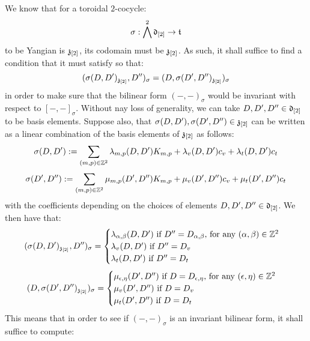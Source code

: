         \begin{remark} \label{remark: yangian_criterion_for_toroidal_cocycles}
            We know that for a toroidal $2$-cocycle:
                $$\sigma: \bigwedge^2 \mathfrak{d}_{[2]} \to \mathfrak{t}$$
            to be Yangian is $\mathfrak{z}_{[2]}$, its codomain must be $\mathfrak{z}_{[2]}$. As such, it shall suffice to find a condition that it must satisfy so that:
                $$(\sigma(D, D')_{\mathfrak{z}_{[2]}}, D'')_{\sigma} = (D, \sigma(D', D'')_{\mathfrak{z}_{[2]}})_{\sigma}$$
            in order to make sure that the bilinear form $(-, -)_{\sigma}$ would be invariant with respect to $[-, -]_{\sigma}$. Without nay loss of generality, we can take $D, D', D'' \in \mathfrak{d}_{[2]}$ to be basis elements. Suppose also, that $\sigma(D, D'), \sigma(D', D'') \in \mathfrak{z}_{[2]}$ can be written as a linear combination of the basis elements of $\mathfrak{z}_{[2]}$ as follows:
                $$\sigma(D, D') := \sum_{(m, p) \in \mathbb{Z}^2} \lambda_{m, p}(D, D') K_{m, p} + \lambda_v(D, D') c_v + \lambda_t(D, D') c_t$$
                $$\sigma(D', D'') := \sum_{(m, p) \in \mathbb{Z}^2} \mu_{m, p}(D', D'') K_{m, p} + \mu_v(D', D'') c_v + \mu_t(D', D'') c_t$$
            with the coefficients depending on the choices of elements $D, D', D'' \in \mathfrak{d}_{[2]}$. We then have that:
                $$
                    (\sigma(D, D')_{\mathfrak{z}_{[2]}}, D'')_{\sigma} =
                    \begin{cases}
                        \text{$\lambda_{\alpha, \beta}(D, D')$ if $D'' = D_{\alpha, \beta}$, for any $(\alpha, \beta) \in \mathbb{Z}^2$}
                        \\
                        \text{$\lambda_v(D, D')$ if $D'' = D_v$}
                        \\
                        \text{$\lambda_t(D, D')$ if $D'' = D_t$}
                    \end{cases}
                $$
                $$
                    (D, \sigma(D', D'')_{\mathfrak{z}_{[2]}})_{\sigma} =
                    \begin{cases}
                        \text{$\mu_{\epsilon, \eta}(D', D'')$ if $D = D_{\epsilon, \eta}$, for any $(\epsilon, \eta) \in \mathbb{Z}^2$}
                        \\
                        \text{$\mu_v(D', D'')$ if $D = D_v$}
                        \\
                        \text{$\mu_t(D', D'')$ if $D = D_t$}
                    \end{cases}
                $$
            This means that in order to see if $(-, -)_{\sigma}$ is an invariant bilinear form, it shall suffice to compute:

\end{remark}
